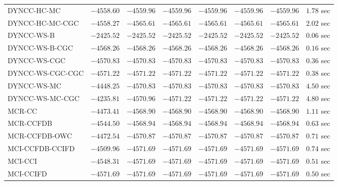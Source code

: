 \begin{table}[H]
\begin{tabular}{lrrrrrrr}
         DYNCC-HC-MC & $     -4558.60$ & $     -4559.96$ & $     -4559.96$ & $     -4559.96$ & $     -4559.96$ & $     -4559.96$ & $         1.78$ sec   \\ 
     DYNCC-HC-MC-CGC & $     -4558.27$ & $     -4565.61$ & $     -4565.61$ & $     -4565.61$ & $     -4565.61$ & $     -4565.61$ & $         2.02$ sec   \\ 
          DYNCC-WS-B & $     -2425.52$ & $     -2425.52$ & $     -2425.52$ & $     -2425.52$ & $     -2425.52$ & $     -2425.52$ & $         0.06$ sec   \\ 
      DYNCC-WS-B-CGC & $     -4568.26$ & $     -4568.26$ & $     -4568.26$ & $     -4568.26$ & $     -4568.26$ & $     -4568.26$ & $         0.16$ sec   \\ 
        DYNCC-WS-CGC & $     -4570.83$ & $     -4570.83$ & $     -4570.83$ & $     -4570.83$ & $     -4570.83$ & $     -4570.83$ & $         0.36$ sec   \\ 
    DYNCC-WS-CGC-CGC & $     -4571.22$ & $     -4571.22$ & $     -4571.22$ & $     -4571.22$ & $     -4571.22$ & $     -4571.22$ & $         0.38$ sec   \\ 
         DYNCC-WS-MC & $     -4448.25$ & $     -4570.83$ & $     -4570.83$ & $     -4570.83$ & $     -4570.83$ & $     -4570.83$ & $         4.50$ sec   \\ 
     DYNCC-WS-MC-CGC & $     -4235.81$ & $     -4570.96$ & $     -4571.22$ & $     -4571.22$ & $     -4571.22$ & $     -4571.22$ & $         4.80$ sec   \\ 
\cmidrule{1-1} 
              MCR-CC & $     -4473.41$ & $     -4568.90$ & $     -4568.90$ & $     -4568.90$ & $     -4568.90$ & $     -4568.90$ & $         1.11$ sec   \\ 
           MCR-CCFDB & $     -4544.50$ & $     -4568.94$ & $     -4568.94$ & $     -4568.94$ & $     -4568.94$ & $     -4568.94$ & $         0.63$ sec   \\ 
       MCR-CCFDB-OWC & $     -4472.54$ & $     -4570.87$ & $     -4570.87$ & $     -4570.87$ & $     -4570.87$ & $     -4570.87$ & $         0.71$ sec   \\ 
\cmidrule{1-1} 
     MCI-CCFDB-CCIFD & $     -4509.96$ & $     -4571.69$ & $     -4571.69$ & $     -4571.69$ & $     -4571.69$ & $     -4571.69$ & $         0.74$ sec   \\ 
             MCI-CCI & $     -4548.31$ & $     -4571.69$ & $     -4571.69$ & $     -4571.69$ & $     -4571.69$ & $     -4571.69$ & $         0.51$ sec   \\ 
           MCI-CCIFD & $     -4571.69$ & $     -4571.69$ & $     -4571.69$ & $     -4571.69$ & $     -4571.69$ & $     -4571.69$ & $         0.50$ sec   \\ 
\bottomrule
\end{tabular}
\end{table}
